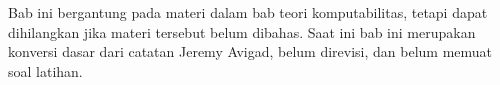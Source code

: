 \documentclass[../../../include/open-logic-chapter]{subfiles}
\begin{document}
\begin{editorial}
  Bab ini bergantung pada materi dalam bab teori komputabilitas, tetapi dapat
  dihilangkan jika materi tersebut belum dibahas. Saat ini bab ini merupakan
  konversi dasar dari catatan Jeremy Avigad, belum direvisi, dan belum memuat
  soal latihan.
\end{editorial}












\OLEndChapterHook
\end{document}
